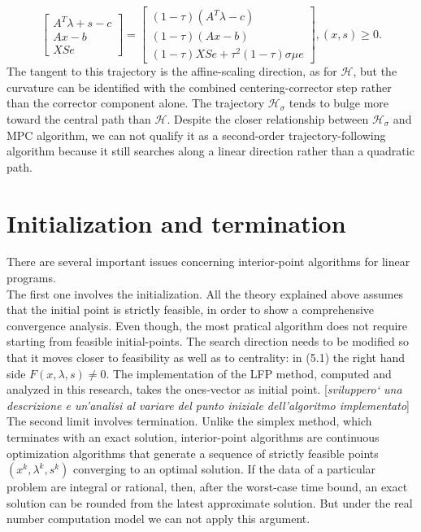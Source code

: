 \documentclass[a4paper,10 pt,titlepage,twoside]{book}
\theoremstyle{plain}
\theoremstyle{definition}
\theoremstyle{remark}
\begin{document}
\begin{equation}\label{T}
\begin{bmatrix}
A^{T}\lambda+s-c \\Ax-b \\XSe
\end{bmatrix}=\begin{bmatrix}
(1-\tau)(A^{T}\lambda-c)\\(1-\tau)(Ax-b)\\(1-\tau)XSe+\tau^{2}(1-\tau)\sigma\mu e
\end{bmatrix},(x,s)\geq0.
\end{equation}
The tangent to this trajectory is the affine-scaling direction, as for $\mathcal{H}$, but the curvature can be identified with the combined centering-corrector step rather than the corrector component alone. The trajectory $\mathcal{H}_{\sigma}$ tends to bulge more toward the central path than $\mathcal{H}$. Despite the closer relationship between $\mathcal{H}_{\sigma}$  and MPC algorithm, we can not qualify it as a second-order trajectory-following algorithm because it still searches along a linear direction rather than a quadratic path.  
\section{Initialization and termination} 

There are several important issues concerning interior-point algorithms
for linear programs.\\The first one involves the initialization. All the theory explained above assumes that the initial point is strictly feasible, in order to show  a comprehensive convergence analysis. Even though, the most pratical algorithm does not require starting from  feasible initial-points. The search direction needs to be modified so that it moves closer to feasibility as well as to
centrality: in (5.1) the right hand side $F(x, \lambda, s)\neq0$. The implementation of the LFP method, computed and analyzed in this research, takes the ones-vector as initial point. [\textit{sviluppero` una descrizione e un'analisi al variare del punto iniziale dell'algoritmo implementato}]
\\
 The second limit involves termination. Unlike the simplex method,
which terminates with an exact solution, interior-point algorithms are continuous
optimization algorithms that generate a sequence of strictly feasible points $(x^{k}, \lambda^{k},s^{k})$ converging to
an optimal solution. If the data of a particular problem are integral or rational, then, after the worst-case time bound, an exact solution can be
rounded from the latest approximate solution. But under
the real number computation model we can not apply this argument.\\ 
\end{document}
